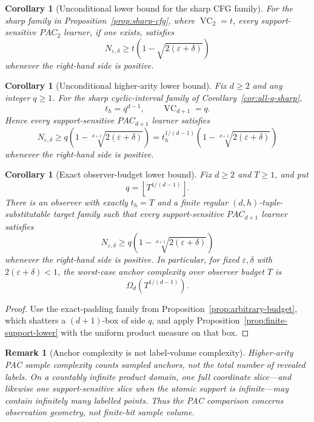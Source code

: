 \documentclass[11pt]{article}
\newtheorem{corollary}[theorem]{Corollary}
\newtheorem{remark}[theorem]{Remark}
\newcommand{\eps}{\varepsilon}
\newcommand{\VC}{\operatorname{VC}}
\begin{document}
\begin{corollary}[Unconditional lower bound for the sharp CFG family]
\label{cor:sharp-support-pac-lower}
For the sharp family in Proposition~\ref{prop:sharp-cfg}, where
\(\VC_2=t\), every support-sensitive \(PAC_2\) learner, if one exists,
satisfies
\[
 N_{\eps,\delta}
 \ge
 t\left(1-\sqrt{2(\eps+\delta)}\right)
\]
whenever the right-hand side is positive.
\end{corollary}

\begin{corollary}[Unconditional higher-arity lower bound]
\label{cor:higher-support-pac-lower}
Fix \(d\ge2\) and any integer \(q\ge1\).  For the sharp cyclic-interval
family of Corollary~\ref{cor:all-q-sharp},
\[
 t_h=q^{d-1},
 \qquad
 \VC_{d+1}=q.
\]
Hence every support-sensitive \(PAC_{d+1}\) learner satisfies
\[
 N_{\eps,\delta}
 \ge
 q\left(1-\sqrt[d+1]{2(\eps+\delta)}\right)
 =
 t_h^{1/(d-1)}
 \left(1-\sqrt[d+1]{2(\eps+\delta)}\right)
\]
whenever the right-hand side is positive.
\end{corollary}

\begin{corollary}[Exact observer-budget lower bound]
\label{cor:budget-support-pac-lower}
Fix \(d\ge2\) and \(T\ge1\), and put
\[
 q=\left\lfloor T^{1/(d-1)}\right\rfloor.
\]
There is an observer with exactly \(t_h=T\) and a finite regular
\((d,h)\)-tuple-substitutable target family such that every
support-sensitive \(PAC_{d+1}\) learner satisfies
\[
 N_{\eps,\delta}
 \ge
 q\left(1-\sqrt[d+1]{2(\eps+\delta)}\right)
\]
whenever the right-hand side is positive.  In particular, for fixed
\(\eps,\delta\) with \(2(\eps+\delta)<1\), the worst-case anchor
complexity over observer budget \(T\) is
\[
 \Omega_d\!\left(T^{1/(d-1)}\right).
\]
\end{corollary}

\begin{proof}
Use the exact-padding family from
Proposition~\ref{prop:arbitrary-budget}, which shatters a
\((d+1)\)-box of side \(q\), and apply
Proposition~\ref{prop:finite-support-lower} with the uniform product
measure on that box.
\end{proof}

\begin{remark}[Anchor complexity is not label-volume complexity]
\label{rem:anchor-volume}
Higher-arity PAC sample complexity counts sampled anchors, not the total
number of revealed labels.  On a countably infinite product domain, one
full coordinate slice---and likewise one support-sensitive slice when the
atomic support is infinite---may contain infinitely many labelled points.
Thus the PAC comparison concerns observation geometry, not finite-bit sample
volume.
\end{remark}
\end{document}
